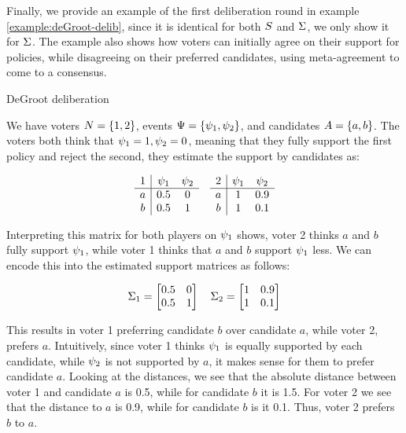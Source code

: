 Finally, we provide an example of the first deliberation round in example
\ref{example:deGroot-delib}, since it is identical for both $S$ and
$\Sigma$, we only show it for $\Sigma$. The example also shows how
voters can initially agree on their support for policies, while disagreeing on
their preferred candidates, using meta-agreement to come to a consensus.

\begin{example}{DeGroot deliberation} {}

	We have voters \(N = \{1,2\}\), events \(\Psi =
	\{\psi_{1}, \psi_{2}\}\), and candidates \(A =
	\{a,b\}\). The voters both think that \(\psi_{1} = 1, \psi_{2} =
	0\), meaning that they fully support the first policy and reject the
	second, they estimate the support by candidates as:

	\[
		\begin{array}{c|cc}
			1 & \psi_1 & \psi_2 \\ \hline
			a & 0.5       & 0         \\
			b & 0.5       & 1         \\
		\end{array}
		\hspace{1em}
		\begin{array}{c|cc}
			2 & \psi_1 & \psi_2 \\ \hline
			a & 1         & 0.9       \\
			b & 1         & 0.1       \\
		\end{array}
	\]

	Interpreting this matrix for both players on $\psi_1$ shows, voter 2 thinks $a$ and $b$ fully support $\psi_1$, while voter 1 thinks that $a$ and $b$  support $\psi_1$ less. We can encode this into the estimated support matrices as follows:

	\[ \Sigma_1 =\begin{bmatrix} 0.5 & 0 \\
                0.5 & 1 \\\end{bmatrix}\quad
		\Sigma_2 =\begin{bmatrix} 1 & 0.9
                \\ 1 & 0.1 \\\end{bmatrix} \]

	This results in voter 1 preferring candidate $b$ over candidate $a$, while
	voter 2, prefers $a$. Intuitively, since voter 1 thinks $\psi_{1}$ is
	equally supported by each candidate, while $\psi_{2}$ is not supported by
	$a$, it makes sense for them to prefer candidate $a$. Looking at the distances,
	we see that the absolute distance between voter 1 and candidate $a$ is 0.5,
	while for candidate $b$ it is 1.5. For voter 2 we see that the distance to
	$a$ is 0.9, while for candidate $b$ is it 0.1. Thus, voter 2 prefers $b$ to
	$a$.


\end{example}
